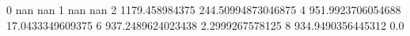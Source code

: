 0 nan nan
1 nan nan
2 1179.458984375 244.50994873046875
4 951.9923706054688 17.0433349609375
6 937.2489624023438 2.2999267578125
8 934.9490356445312 0.0
